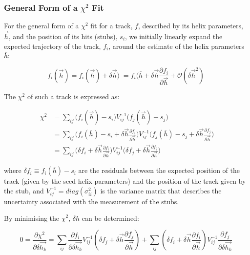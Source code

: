 \subsubsection{General Form of a $\chi^{2}$ Fit}\label{subsubsec:chi2maths}
For the general form of a $\chi^{2}$ fit for a track, $f$, described by its helix parameters, $\overrightarrow{h}$, and the position of its hits (\ie stubs), $s_{i}$, we initially linearly expand the expected trajectory of the track, $f_{i}$, around the estimate of the helix parameters $\overline{h}$:

\begin{equation}
f_{i}(\overrightarrow{h} ) = f_{i}(\overrightarrow{h}) + \delta \overrightarrow{h}) \;
                           = f_{i}(\overline{h} + \delta \overrightarrow{h} \frac{\partial f_{i}}{\partial \overrightarrow{h}} + \mathcal{O}(\delta \overrightarrow{h}^{2}) \;
\label{eq:chi1}
\end{equation}

The $\chi^{2}$ of such a track is expressed as:

\begin{equation}
\begin{split}
\chi^{2} &= \sum_{ij} \big(f_{i}(\overrightarrow{h}) - s_{i} \big) V^{-1}_{ij}  \big(f_{j}(\overrightarrow{h}) - s_{j} \big)  \\
         &= \sum_{ij} \big( f_{i}(\overline{h})  - s_{i} + \delta \overrightarrow{h} \frac{\partial f_{i}}{\partial \overrightarrow{h}} \big) V^{-1}_{ij}  \big( f_{j}(\overline{h})  - s_{j} + \delta \overrightarrow{h} \frac{\partial f_{j}}{\partial \overrightarrow{h}} \big)  \\
         &= \sum_{ij} \big( \delta f_{i} + \delta \overrightarrow{h} \frac{\partial f_{i}}{\partial \overrightarrow{h}} \big) V^{-1}_{ij}  \big( \delta f_{j} + \delta \overrightarrow{h} \frac{\partial f_{j}}{\partial \overrightarrow{h}} \big)
\end{split}
\label{eq:chi2}
\end{equation}

where $\delta f_{i} \equiv f_{i}(\overline{h}) - s_{i}$ are the residuals between the expected position of the track (given by the seed helix parameters) and the position of the track given by the stub, and $V^{-1}_{ij} = diag(\sigma^{2}_{ii})$ is the variance matrix that describes the uncertainty associated with the measurement of the stubs.

By minimising the $\chi^{2}$, $\delta h$ can be determined:

\begin{equation}
0 = \frac{\partial \chi^{2}}{\partial \delta \overrightarrow{h_{k}}} = \sum_{ij} \frac{\partial f_{i}}{\partial \delta \overrightarrow{h_{k}}} V^{-1}_{ij} ( \delta f_{j} + \delta \overrightarrow{h} \frac{\partial f_{j}}{\partial \overrightarrow{h}} ) + \sum_{ij}	( \delta f_{i} + \delta \overrightarrow{h} \frac{\partial f_{i}}{\partial \overrightarrow{h}} ) V^{-1}_{ij} \frac{\partial f_{j}}{\partial \delta \overrightarrow{h_{k}}}  \;
\label{eq:chi3}
\end{equation}

